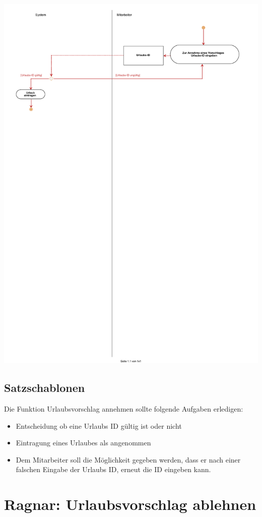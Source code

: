\begin{center}
\includegraphics[width=0.9\linewidth]{Urlaubsvorschlag_annehmen.pdf}
\end{center}

\subsection{Satzschablonen}
Die Funktion Urlaubsvorschlag annehmen sollte folgende Aufgaben erledigen:
\begin{itemize}
	\item Entscheidung ob eine Urlaubs ID gültig ist oder nicht
	\item Eintragung eines Urlaubes als angenommen
	\item Dem Mitarbeiter soll die Möglichkeit gegeben werden, dass er nach einer falschen Eingabe der Urlaubs ID, erneut die ID eingeben kann.
\end{itemize}

\section{Ragnar: Urlaubsvorschlag ablehnen}

